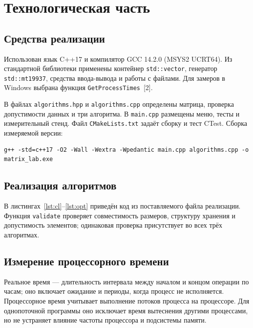 \documentclass[14pt,a4paper]{extarticle}
\numberwithin{equation}{section}
\begin{document}
\clearpage\section{Технологическая часть}
\subsection{Средства реализации}
Использован язык C++17 и компилятор GCC 14.2.0 (MSYS2 UCRT64). Из стандартной библиотеки применены контейнер \texttt{std::vector}, генератор \texttt{std::mt19937}, средства ввода-вывода и работы с файлами. Для замеров в Windows выбрана функция \texttt{GetProcessTimes}~[2].

В файлах \texttt{algorithms.hpp} и \texttt{algorithms.cpp} определены матрица, проверка допустимости данных и три алгоритма. В \texttt{main.cpp} размещены меню, тесты и измерительный стенд. Файл \texttt{CMakeLists.txt} задаёт сборку и тест CTest. Сборка измеряемой версии:
\begin{lstlisting}[language={},caption={Команда сборки программы}]
g++ -std=c++17 -O2 -Wall -Wextra -Wpedantic main.cpp algorithms.cpp -o matrix_lab.exe
\end{lstlisting}
\subsection{Реализация алгоритмов}
В листингах~\ref{lst:cl}--\ref{lst:opt} приведён код из поставляемого файла реализации. Функция \texttt{validate} проверяет совместимость размеров, структуру хранения и допустимость элементов; одинаковая проверка присутствует во всех трёх алгоритмах.

\clearpage

\clearpage


\subsection{Измерение процессорного времени}
Реальное время — длительность интервала между началом и концом операции по часам; оно включает ожидание и периоды, когда процесс не исполняется. Процессорное время учитывает выполнение потоков процесса на процессоре. Для однопоточной программы оно исключает время вытеснения другими процессами, но не устраняет влияние частоты процессора и подсистемы памяти.
\end{document}
